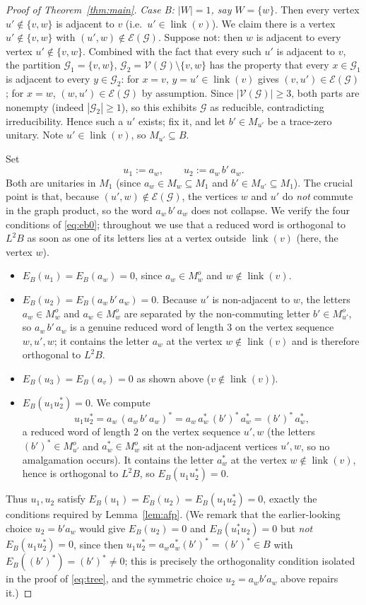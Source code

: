 \documentclass[a4paper, 11pt, reqno]{amsart}
\numberwithin{equation}{section}
\theoremstyle{plain}
\theoremstyle{remark}
\theoremstyle{definition}
\newcommand{\VV}{{\mathcal V}}
\newcommand{\EE}{{\mathcal E}}
\newcommand{\GG}{{\mathcal G}}
\begin{document}
\begin{proof}[Proof of Theorem~\ref{thm:main}]
\emph{Case B: $|W|=1$, say $W=\{w\}$.} Then every vertex $u'\notin\{v,w\}$ is adjacent to $v$ (i.e.\ $u'\in\operatorname{link}(v)$). We claim there is a vertex $u'\notin\{v,w\}$ with $(u',w)\notin\EE(\GG)$. Suppose not: then $w$ is adjacent to every vertex $u'\notin\{v,w\}$. Combined with the fact that every such $u'$ is adjacent to $v$, the partition $\GG_1=\{v,w\}$, $\GG_2=\VV(\GG)\setminus\{v,w\}$ has the property that every $x\in\GG_1$ is adjacent to every $y\in\GG_2$: for $x=v$, $y=u'\in\operatorname{link}(v)$ gives $(v,u')\in\EE(\GG)$; for $x=w$, $(w,u')\in\EE(\GG)$ by assumption. Since $|\VV(\GG)|\ge3$, both parts are nonempty (indeed $|\GG_2|\ge1$), so this exhibits $\GG$ as reducible, contradicting irreducibility. Hence such a $u'$ exists; fix it, and let $b'\in M_{u'}$ be a trace-zero unitary. Note $u'\in\operatorname{link}(v)$, so $M_{u'}\subseteq B$.

Set
\[
u_1:=a_w,\qquad u_2:=a_w\,b'\,a_w .
\]
Both are unitaries in $M_1$ (since $a_w\in M_w\subseteq M_1$ and $b'\in M_{u'}\subseteq M_1$). The crucial point is that, because $(u',w)\notin\EE(\GG)$, the vertices $w$ and $u'$ do \emph{not} commute in the graph product, so the word $a_w\,b'\,a_w$ does not collapse. We verify the four conditions of \eqref{eq:eb0}; throughout we use that a reduced word is orthogonal to $L^2B$ as soon as one of its letters lies at a vertex outside $\operatorname{link}(v)$ (here, the vertex $w$).

\begin{itemize}
\item $E_B(u_1)=E_B(a_w)=0$, since $a_w\in M_w^o$ and $w\notin\operatorname{link}(v)$.
\item $E_B(u_2)=E_B(a_w\,b'\,a_w)=0$. Because $u'$ is non-adjacent to $w$, the letters $a_w\in M_w^o$ and $a_w\in M_w^o$ are separated by the non-commuting letter $b'\in M_{u'}^o$, so $a_w\,b'\,a_w$ is a genuine reduced word of length $3$ on the vertex sequence $w,u',w$; it contains the letter $a_w$ at the vertex $w\notin\operatorname{link}(v)$ and is therefore orthogonal to $L^2B$.
\item $E_B(u_3)=E_B(a_v)=0$ as shown above ($v\notin\operatorname{link}(v)$).
\item $E_B(u_1u_2^*)=0$. We compute
\[
u_1u_2^*=a_w\,(a_w\,b'\,a_w)^*=a_w\,a_w^*\,(b')^*\,a_w^*=(b')^*\,a_w^* ,
\]
a reduced word of length $2$ on the vertex sequence $u',w$ (the letters $(b')^*\in M_{u'}^o$ and $a_w^*\in M_w^o$ sit at the non-adjacent vertices $u',w$, so no amalgamation occurs). It contains the letter $a_w^*$ at the vertex $w\notin\operatorname{link}(v)$, hence is orthogonal to $L^2B$, so $E_B(u_1u_2^*)=0$.
\end{itemize}
Thus $u_1,u_2$ satisfy $E_B(u_1)=E_B(u_2)=E_B(u_1u_2^*)=0$, exactly the conditions required by Lemma~\ref{lem:afp}. (We remark that the earlier-looking choice $u_2=b'a_w$ would give $E_B(u_2)=0$ and $E_B(u_1^*u_2)=0$ but \emph{not} $E_B(u_1u_2^*)=0$, since then $u_1u_2^*=a_w a_w^*(b')^*=(b')^*\in B$ with $E_B((b')^*)=(b')^*\neq0$; this is precisely the orthogonality condition isolated in the proof of \eqref{eq:tree}, and the symmetric choice $u_2=a_w b' a_w$ above repairs it.)


\end{proof}
\end{document}
